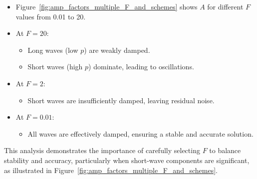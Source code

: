 \documentclass{article}
\begin{document}
			\begin{itemize}
				\item Figure~\ref{fig:amp_factors_multiple_F_and_schemes} shows \( A \) for different \( F \) values from 0.01 to 20.
				\item At \( F = 20 \):
				\begin{itemize}
					\item Long waves (low \( p \)) are weakly damped.
					\item Short waves (high \( p \)) dominate, leading to oscillations.
				\end{itemize}
				\item At \( F = 2 \):
				\begin{itemize}
					\item Short waves are insufficiently damped, leaving residual noise.
				\end{itemize}
				\item At \( F = 0.01 \):
				\begin{itemize}
					\item All waves are effectively damped, ensuring a stable and accurate solution.
				\end{itemize}
			\end{itemize}
			
			This analysis demonstrates the importance of carefully selecting \( F \) to balance stability and accuracy, particularly when short-wave components are significant, as illustrated in Figure~\ref{fig:amp_factors_multiple_F_and_schemes}.
			
\end{document}
